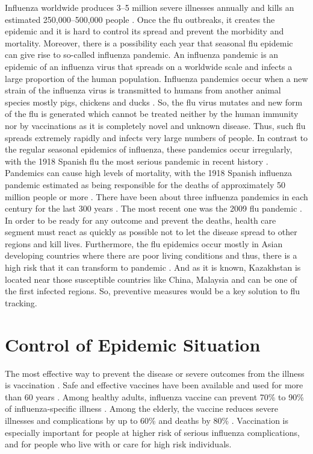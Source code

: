 Influenza worldwide produces 3–5 million severe illnesses annually and kills an estimated 250,000–500,000 people \cite{per2}. Once the flu outbreaks, it creates the epidemic and it is hard to control its spread and prevent the morbidity and mortality. Moreover, there is a possibility each year that seasonal flu epidemic can give rise to so-called influenza pandemic. An influenza pandemic is an epidemic of an influenza virus that spreads on a worldwide scale and infects a large proportion of the human population.\cite{per3} Influenza pandemics occur when a new strain of the influenza virus is transmitted to humans from another animal species mostly pigs, chickens and ducks \cite{per3}. So, the flu virus mutates and new form of the flu is generated which cannot be treated neither by the human immunity nor by vaccinations as it is completely novel and unknown disease. Thus, such flu spreads extremely rapidly and infects very large numbers of people. In contrast to the regular seasonal epidemics of influenza, these pandemics occur irregularly, with the 1918 Spanish flu the most serious pandemic in recent history \cite{per3}. Pandemics can cause high levels of mortality, with the 1918 Spanish influenza pandemic estimated as being responsible for the deaths of approximately 50 million people or more \cite{per3}. There have been about three influenza pandemics in each century for the last 300 years \cite{per4}. The most recent one was the 2009 flu pandemic \cite{per4}. In order to be ready for any outcome and prevent the deaths, health care segment must react as quickly as possible not to let the disease spread to other regions and kill lives. Furthermore, the flu epidemics occur mostly in Asian developing countries where there are poor living conditions and thus, there is a high risk that it can transform to pandemic \cite{per4}. And as it is known, Kazakhstan is located near those susceptible countries like China, Malaysia and can be one of the first infected regions. So, preventive measures would be a key solution to flu tracking.

\section{Control of Epidemic Situation}

The most effective way to prevent the disease or severe outcomes from the illness is vaccination \cite{per1}. Safe and effective vaccines have been available and used for more than 60 years \cite{per1}. Among healthy adults, influenza vaccine can prevent 70\% to 90\% of influenza-specific illness \cite{per1}. Among the elderly, the vaccine reduces severe illnesses and complications by up to 60\% and deaths by 80\% \cite{per1}. Vaccination is especially important for people at higher risk of serious influenza complications, and for people who live with or care for high risk individuals.

